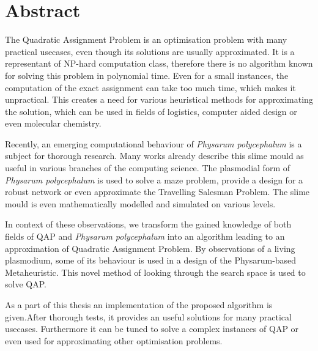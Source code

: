 \chapter*{Abstract}

The Quadratic Assignment Problem is an optimisation problem with many practical usecases, even though its solutions are usually approximated. It is a representant of NP-hard computation class, therefore there is no algorithm known for solving this problem in polynomial time. Even for a small instances, the computation of the exact assignment can take too much time, which makes it unpractical. This creates a need for various heuristical methods for approximating the solution, which can be used in fields of logistics, computer aided design or even molecular chemistry.

Recently, an emerging computational behaviour of \textit{Physarum polycephalum} is a subject for thorough research. Many works already describe this slime mould as useful in various branches of the computing science. The plasmodial form of \textit{Physarum polycephalum} is used to solve a maze problem, provide a design for a robust network or even approximate the Travelling Salesman Problem. The slime mould is even mathematically modelled and simulated on various levels.

In context of these observations, we transform the gained knowledge of both fields of QAP and \textit{Physarum polycephalum} into an algorithm leading to an approximation of Quadratic Assignment Problem. By observations of a living plasmodium, some of its behaviour is used in a design of the Physarum-based Metaheuristic. This novel method of looking through the search space is used to solve QAP.

As a part of this thesis an implementation of the proposed algorithm is given.After thorough tests, it provides an useful solutions for many practical usecases. Furthermore it can be tuned to solve a complex instances of QAP or even used for approximating other optimisation problems.
